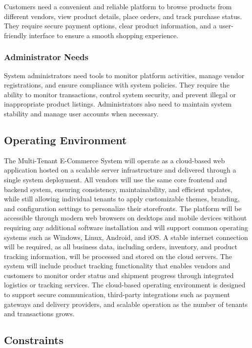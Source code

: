 Customers need a convenient and reliable platform to browse products from different vendors, view product details, place orders, and track purchase status. They require secure payment options, clear product information, and a user-friendly interface to ensure a smooth shopping experience.

\subsubsection{Administrator Needs}
\label{subsec:administrator-needs}

System administrators need tools to monitor platform activities, manage vendor registrations, and ensure compliance with system policies. They require the ability to monitor transactions, control system security, and prevent illegal or inappropriate product listings. Administrators also need to maintain system stability and manage user accounts when necessary.

\subsection{Operating Environment}

The Multi-Tenant E-Commerce System will operate as a cloud-based web application hosted on a scalable server infrastructure and delivered through a single system deployment. All vendors will use the same core frontend and backend system, ensuring consistency, maintainability, and efficient updates, while still allowing individual tenants to apply customizable themes, branding, and configuration settings to personalize their storefronts. The platform will be accessible through modern web browsers on desktops and mobile devices without requiring any additional software installation and will support common operating systems such as Windows, Linux, Android, and iOS. A stable internet connection will be required, as all business data, including orders, inventory, and product tracking information, will be processed and stored on the cloud servers. The system will include product tracking functionality that enables vendors and customers to monitor order status and shipment progress through integrated logistics or tracking services. The cloud-based operating environment is designed to support secure communication, third-party integrations such as payment gateways and delivery providers, and scalable operation as the number of tenants and transactions grows.


\subsection{Constraints}

